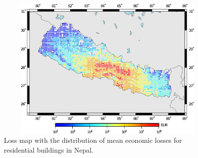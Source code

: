 \begin{figure}[ht]
\centering
\includegraphics[width=12cm,height=7cm]{./figures/risk/LossmapDet.eps}
\caption{Loss map with the distribution of mean economic losses for residential buildings in Nepal.}
\label{fig:detlosses}
\end{figure} 